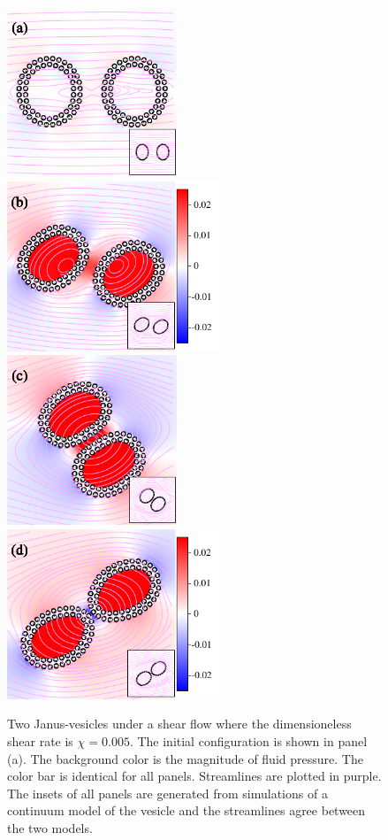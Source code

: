 \documentclass[lineno]{jfm}
\begin{document}
\begin{figure}
\centering
\includegraphics[height=2in]{N116_shear_0.pdf}
\includegraphics[height=2in]{N116_shear_2500.pdf}\\
\includegraphics[height=2in]{N116_shear_5000.pdf}
\includegraphics[height=2in]{N116_shear_7500.pdf}
  \caption{\label{figure10} Two Janus-vesicles under a shear flow where
  the dimensioneless shear rate is $\chi=0.005$. The initial
  configuration is shown in panel (a). The background color is the
  magnitude of fluid pressure. The color bar is identical for all
  panels. Streamlines are plotted in purple. The insets of all panels
  are generated from simulations of a continuum model of the vesicle and
  the streamlines agree between the two models.}
\end{figure}
\end{document}
